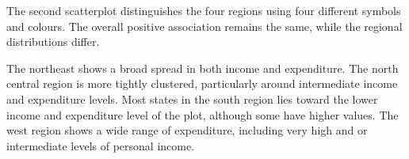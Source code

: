 \documentclass[12pt,letterpaper]{article}
\begin{document}
\begin{itemize}
     
     \noindent The second scatterplot distinguishes the four regions using four different symbols and colours. The overall positive association remains the same, while the regional distributions differ. 
     
     The northeast shows a broad spread in both income and expenditure. The north central region is more tightly clustered, particularly around intermediate income and expenditure levels. Most states in the south region lies toward the lower income and expenditure level of the plot, although some have higher values. The west region shows a wide range of expenditure, including very high and or intermediate levels of personal income.
     
   
     
    
\end{itemize}

    
\end{document}
